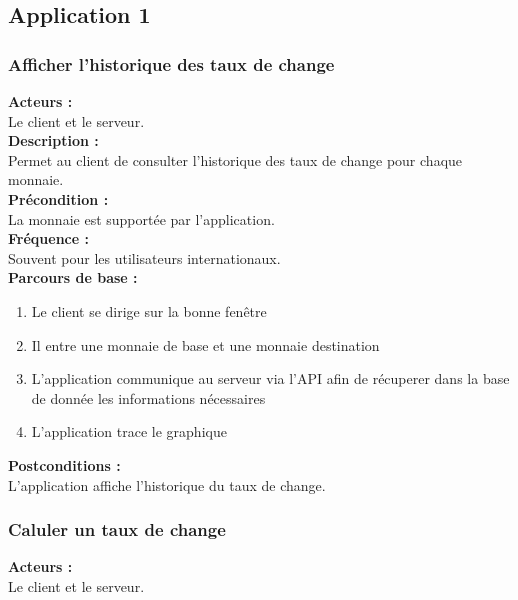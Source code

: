 \documentclass[../annexe.tex]{subfiles}
\begin{document}
\subsection{Application 1}



\subsubsection{Afficher l'historique des taux de change}

\textbf{Acteurs :} \\
Le client et le serveur. \\

\textbf{Description :} \\
Permet au client de consulter l'historique des taux de change pour chaque monnaie. \\

\textbf{Précondition :} \\
La monnaie est supportée par l'application. \\

\textbf{Fréquence :} \\
Souvent pour les utilisateurs internationaux. \\

\textbf{Parcours de base :} \\
\begin{enumerate}
    \item Le client se dirige sur la bonne fenêtre
    \item Il entre une monnaie de base et une monnaie destination
    \item L'application communique au serveur via l'API afin de récuperer dans la base de donnée les informations nécessaires
    \item L'application trace le graphique
\end{enumerate}
\bigskip

\textbf{Postconditions :} \\
L'application affiche l'historique du taux de change. \\



\subsubsection{Caluler un taux de change}

\textbf{Acteurs :} \\
Le client et le serveur. \\
\end{document}
